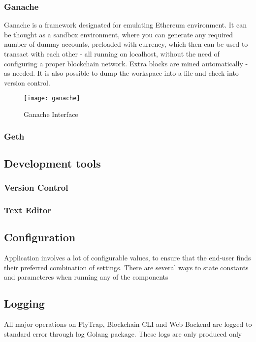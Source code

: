 \subsubsection{Ganache}
Ganache\cite{lee2019testing} is a framework designated for emulating Ethereum environment. It can be thought as a sandbox environment, where you can generate any required number of dummy accounts, preloaded with currency, which then can be used to transact with each other - all running on localhost, without the need of configuring a proper blockchain network. Extra blocks are mined automatically - as needed. It is also possible to dump the workspace into a file and check into version control.
\begin{figure}[h]
    \centering
    \texttt{[image: ganache]}
    \caption{Ganache Interface}
    \label{fig:ganache}
\end{figure}

\subsubsection{Geth}
\subsection{Development tools}
\subsubsection{Version Control}
\subsubsection{Text Editor}

\subsection{Configuration}
Application involves a lot of configurable values, to ensure that the end-user finds their preferred combination of settings. There are several ways to state constants and parameteres when running any of the components 

\subsection{Logging}
All major operations on FlyTrap, Blockchain CLI and Web Backend are logged to standard error through log Golang package. These logs are only produced only 

